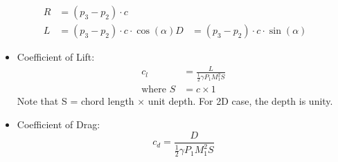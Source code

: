\begin{align*}
    R &= (p_3 - p_2 ) \cdot c \\
    L &= (p_3 - p_2 ) \cdot c \cdot \cos(\alpha)
    D &= (p_3 - p_2 ) \cdot c \cdot \sin(\alpha)
\end{align*}

\begin{itemize}
    \item Coefficient of Lift:
    \begin{align*}
        c_l &= \frac{L}{\frac{1}{2}\gamma P_1 M_1^2 S} \\
        \text{where } S &= c \times 1
    \end{align*}
    Note that S = chord length $\times$ unit depth. For 2D case, the depth is unity.
    \item Coefficient of Drag:
    \begin{equation*}
        c_d = \frac{D}{\frac{1}{2}\gamma P_1 M_1^2 S}
    \end{equation*}
\end{itemize}